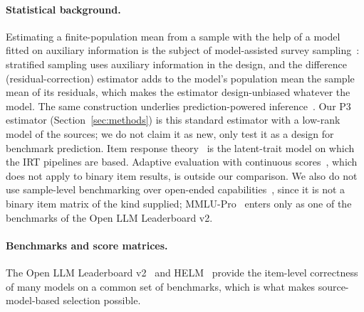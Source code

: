 \paragraph{Statistical background.}
Estimating a finite-population mean from a sample with the help of a model fitted on auxiliary information is the subject of model-assisted survey sampling~\citep{sarndal1992model}: stratified sampling uses auxiliary information in the design, and the difference (residual-correction) estimator adds to the model's population mean the sample mean of its residuals, which makes the estimator design-unbiased whatever the model. The same construction underlies prediction-powered inference~\citep{angelopoulos2023ppi}. Our P3 estimator (Section~\ref{sec:methods}) is this standard estimator with a low-rank model of the sources; we do not claim it as new, only test it as a design for benchmark prediction. Item response theory~\citep{embretson2000irt} is the latent-trait model on which the IRT pipelines are based. Adaptive evaluation with continuous scores~\citep{balkir2026confident}, which does not apply to binary item results, is outside our comparison. We also do not use sample-level benchmarking over open-ended capabilities~\citep{ghosh2024onebench}, since it is not a binary item matrix of the kind supplied; MMLU-Pro~\citep{wang2024mmlupro} enters only as one of the benchmarks of the Open LLM Leaderboard v2.

\paragraph{Benchmarks and score matrices.}
The Open LLM Leaderboard v2~\citep{fourrier2024openllm} and HELM~\citep{liang2023helm} provide the item-level correctness of many models on a common set of benchmarks, which is what makes source-model-based selection possible.
